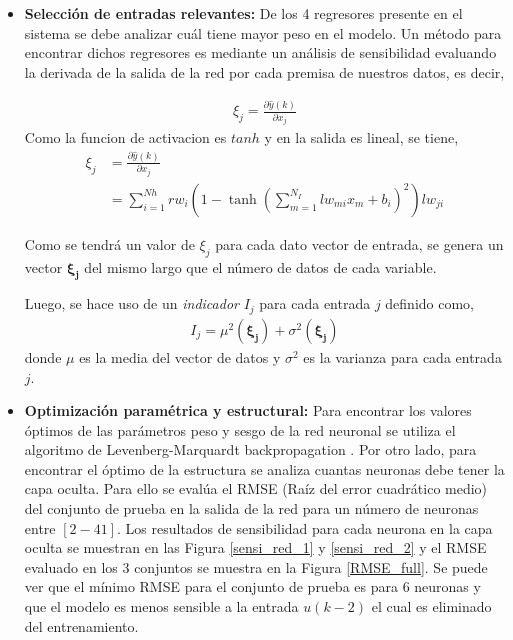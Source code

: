 \documentclass[12pt]{article}
\begin{document}
\begin{itemize}
	
	\item \textbf{Selección de entradas relevantes:} De los 4 regresores presente en el sistema se debe analizar cuál tiene mayor peso en el modelo. Un método para encontrar dichos regresores es mediante un análisis de sensibilidad evaluando la derivada de la salida de la red por cada premisa de nuestros datos, es decir,
	
	\begin{align}
	\xi_j = \frac{\partial \hat{y}(k)}{\partial x_j}		
	\end{align}
	Como la funcion de activacion es $tanh$ y en la salida es lineal, se tiene, 
	\begin{align}
	\xi_j &= \frac{\partial \hat{y}(k)}{\partial x_j} \nonumber \\
	&= \sum_{i=1}^{Nh} rw_i \left(1 - \tanh\left(\sum_{m=1}^{N_I} lw_{mi} x_m + b_i\right)^2 \right) lw_{ji}		
	\end{align}
	
	Como se tendrá un valor de $\xi_j$ para cada dato vector de entrada, se genera un vector $\boldsymbol{\xi_j}$ del mismo largo que el número de datos de cada variable.
	
	Luego, se hace uso de un \textit{indicador} $I_j$ para cada entrada $j$ definido como,
	\begin{align}
	I_j = \mu^2 (\boldsymbol{\xi_j}) + \sigma^2(\boldsymbol{\xi_j})
	\end{align}
	donde $\mu$ es la media del vector de datos y $\sigma^2$ es la varianza para cada entrada $j$. 
	
	\item \textbf{Optimización paramétrica y estructural:} Para encontrar los valores óptimos de las parámetros peso y sesgo de la red neuronal se utiliza el algoritmo de Levenberg-Marquardt backpropagation \cite{matlab_train}. Por otro lado, para encontrar el óptimo de la estructura se analiza cuantas neuronas debe tener la capa oculta. Para ello se evalúa el RMSE (Raíz del error cuadrático medio) del conjunto de prueba en la salida de la red para un número de neuronas entre $[2-41]$. Los resultados de sensibilidad para cada neurona en la capa oculta se muestran en las Figura \ref{sensi_red_1} y \ref{sensi_red_2} y el RMSE evaluado en los 3 conjuntos se muestra en la Figura \ref{RMSE_full}. Se puede ver que el mínimo RMSE para el conjunto de prueba es para $6$ neuronas y que el modelo es menos sensible  a la entrada $u(k-2)$ el cual es eliminado del entrenamiento.
	

\end{itemize}
\end{document}

